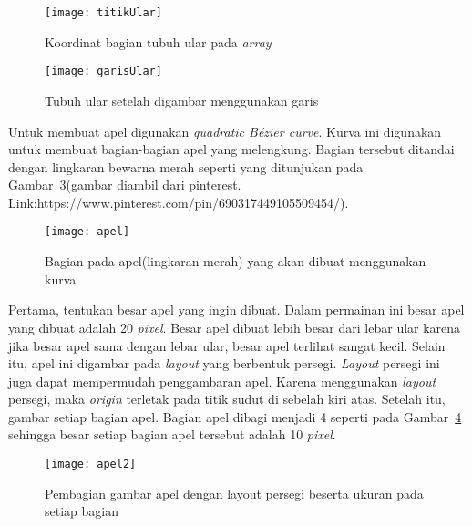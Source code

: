 \begin{figure}[H]
	\centering  
	\texttt{[image: titikUlar]}  
	\caption[Koordinat bagian tubuh ular pada \textit{array}]{Koordinat bagian tubuh ular pada \textit{array}}
	\label{fig:titikUlar} 
\end{figure}

\begin{figure}[H]
	\centering  
	\texttt{[image: garisUlar]}  
	\caption[Tubuh ular setelah digambar menggunakan garis]{Tubuh ular setelah digambar menggunakan garis}
	\label{fig:garisUlar} 
\end{figure}

Untuk membuat apel digunakan \textit{quadratic B\'ezier curve}. Kurva ini digunakan untuk membuat bagian-bagian apel yang melengkung. Bagian tersebut ditandai dengan lingkaran bewarna merah seperti yang ditunjukan pada Gambar~\ref{fig:apel}(gambar diambil dari pinterest. Link:https://www.pinterest.com/pin/690317449105509454/).

\begin{figure}[H]
	\centering  
	\texttt{[image: apel]}  
	\caption[Bagian pada apel(lingkaran merah) yang akan dibuat menggunakan kurva]{Bagian pada apel(lingkaran merah) yang akan dibuat menggunakan kurva}
	\label{fig:apel} 
\end{figure}

Pertama, tentukan besar apel yang ingin dibuat. Dalam permainan ini besar apel yang dibuat adalah 20 \textit{pixel}. Besar apel dibuat lebih besar dari lebar ular karena jika besar apel sama dengan lebar ular, besar apel terlihat sangat kecil. Selain itu, apel ini digambar pada \textit{layout} yang berbentuk persegi. \textit{Layout} persegi ini juga dapat mempermudah penggambaran apel. Karena menggunakan \textit{layout} persegi, maka \textit{origin} terletak pada titik sudut di sebelah kiri atas. Setelah itu, gambar setiap bagian apel. Bagian apel dibagi menjadi 4 seperti pada Gambar~\ref{fig:apel2} sehingga besar setiap bagian apel tersebut adalah 10 \textit{pixel}. 

\begin{figure}[H]
	\centering  
	\texttt{[image: apel2]}  
	\caption[Pembagian gambar apel dengan layout persegi beserta ukuran pada setiap bagian]{Pembagian gambar apel dengan layout persegi beserta ukuran pada setiap bagian}
	\label{fig:apel2} 
\end{figure}

